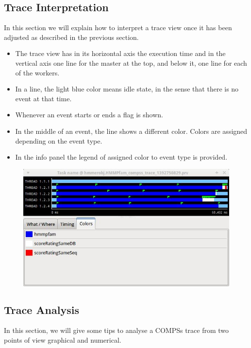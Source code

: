 \subsection{Trace Interpretation}
In this section we will explain how to interpret a trace view once it has been adjusted as 
described in the previous section.

\begin{itemize}
 \item The trace view has in its horizontal axis the execution time and in the vertical 
       axis one line for the master at the top, and below it, one line for each of the workers.
 \item In a line, the light blue color means idle state, in the sense that there is no event at that time.
 \item Whenever an event starts or ends a flag is shown.
 \item In the middle of an event, the line shows a different color. Colors are assigned depending on the event type.
 \item In the info panel the legend of assigned color to event type is provided.
\end{itemize}

\begin{figure}[ht!]
  \centering
    \includegraphics[width=1.0\textwidth]{./Sections/7_Tracing/Figures/7.jpeg}
\end{figure}

\subsection{Trace Analysis}

In this section, we will give some tips to analyse a COMPSs trace from two points of view 
graphical and numerical.

